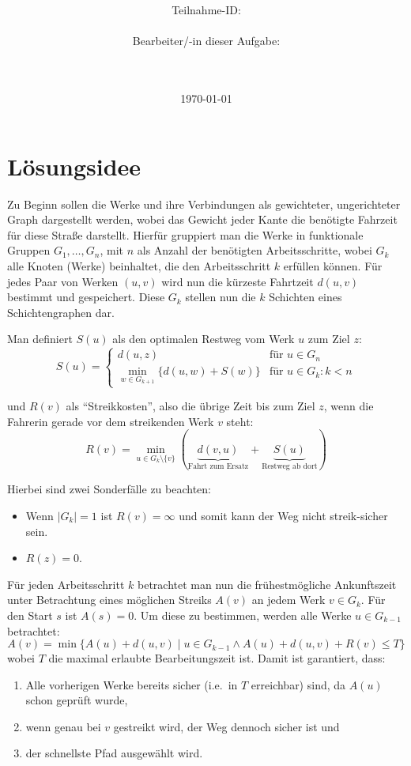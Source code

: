 \documentclass[a4paper,10pt,ngerman]{scrartcl}
\title{\textbf{\Huge\Aufgabe}}
\author{\LARGE Teilnahme-ID: \LARGE \TeilnahmeId \\\\
\LARGE Bearbeiter/-in dieser Aufgabe: \\
\LARGE \Name\\\\}
\date{\LARGE\today}
\begin{document}
    \maketitle
    \tableofcontents

    \vspace{0.5cm}


    \section{Lösungsidee}
    Zu Beginn sollen die Werke und ihre Verbindungen als gewichteter, ungerichteter Graph dargestellt werden, wobei das
    Gewicht jeder Kante die benötigte Fahrzeit für diese Straße darstellt. Hierfür gruppiert man die Werke in
    funktionale Gruppen $G_1, \dots, G_n$, mit $n$ als Anzahl der benötigten Arbeitsschritte, wobei $G_k$ alle
    Knoten (Werke) beinhaltet, die den Arbeitsschritt $k$ erfüllen können. Für jedes Paar von Werken $(u, v)$ wird nun
    die kürzeste Fahrtzeit $d(u, v)$ bestimmt und gespeichert.
    Diese $G_k$ stellen nun die $k$ Schichten eines Schichtengraphen dar.

    Man definiert $S(u)$ als den optimalen Restweg vom Werk $u$ zum Ziel $z$:
    \[
        S(u) =
        \begin{cases}
            d(u, z) & \text{für } u \in G_n \\
            \min_{w \in G_{k+1}} \{ d(u, w) + S(w) \} & \text{für } u \in G_k : k < n
        \end{cases}
    \]

    und $R(v)$ als ``Streikkosten'', also die übrige Zeit bis zum Ziel $z$, wenn die Fahrerin gerade vor dem streikenden
    Werk $v$ steht:
    \[
        R(v) = \min_{u \in G_k \setminus \{v\}} \left( \underbrace{d(v, u)}_{\text{Fahrt zum Ersatz}} + \underbrace{S(u)}_{\text{Restweg ab dort}} \right)
    \]

    Hierbei sind zwei Sonderfälle zu beachten:
    \begin{itemize}
        \item Wenn $|G_k| = 1$ ist $R(v) = \infty$ und somit kann der Weg nicht streik-sicher sein.
        \item $R(z) = 0$.
    \end{itemize}

    Für jeden Arbeitsschritt $k$ betrachtet man nun die frühestmögliche Ankunftszeit unter Betrachtung eines
    möglichen Streiks $A(v)$ an jedem Werk $v \in G_k$. Für den Start $s$ ist $A(s) = 0$. Um diese zu bestimmen, werden
    alle Werke $u \in G_{k-1}$ betrachtet:
    \[
        A(v) = \min \{ A(u) + d(u, v) \mid u \in G_{k-1} \wedge A(u) + d(u, v) + R(v) \leq T \}
    \]
    wobei $T$ die maximal erlaubte Bearbeitungszeit ist. Damit ist garantiert, dass:
    \begin{enumerate}
        \item Alle vorherigen Werke bereits sicher (i.e.\ in $T$ erreichbar) sind, da $A(u)$ schon geprüft wurde,
        \item wenn genau bei $v$ gestreikt wird, der Weg dennoch sicher ist und
        \item der schnellste Pfad ausgewählt wird.
    \end{enumerate}
\end{document}
